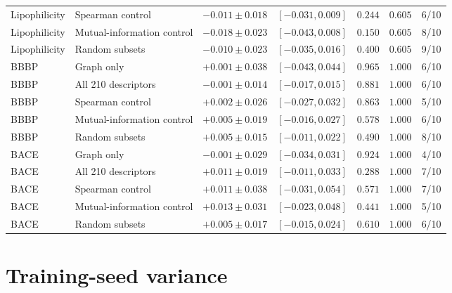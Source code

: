 \documentclass[10pt,a4paper]{article}
\begin{document}
\begin{table}[H]
\begin{tabular}{@{}llccccr@{}}
Lipophilicity & Spearman control & $-0.011\pm0.018$ & $[-0.031,0.009]$ & $0.244$ & $0.605$ & 6/10 \\
Lipophilicity & Mutual-information control & $-0.018\pm0.023$ & $[-0.043,0.008]$ & $0.150$ & $0.605$ & 8/10 \\
Lipophilicity & Random subsets & $-0.010\pm0.023$ & $[-0.035,0.016]$ & $0.400$ & $0.605$ & 9/10 \\
\midrule
BBBP & Graph only & $+0.001\pm0.038$ & $[-0.043,0.044]$ & $0.965$ & $1.000$ & 6/10 \\
BBBP & All 210 descriptors & $-0.001\pm0.014$ & $[-0.017,0.015]$ & $0.881$ & $1.000$ & 6/10 \\
BBBP & Spearman control & $+0.002\pm0.026$ & $[-0.027,0.032]$ & $0.863$ & $1.000$ & 5/10 \\
BBBP & Mutual-information control & $+0.005\pm0.019$ & $[-0.016,0.027]$ & $0.578$ & $1.000$ & 6/10 \\
BBBP & Random subsets & $+0.005\pm0.015$ & $[-0.011,0.022]$ & $0.490$ & $1.000$ & 8/10 \\
\midrule
BACE & Graph only & $-0.001\pm0.029$ & $[-0.034,0.031]$ & $0.924$ & $1.000$ & 4/10 \\
BACE & All 210 descriptors & $+0.011\pm0.019$ & $[-0.011,0.033]$ & $0.288$ & $1.000$ & 7/10 \\
BACE & Spearman control & $+0.011\pm0.038$ & $[-0.031,0.054]$ & $0.571$ & $1.000$ & 7/10 \\
BACE & Mutual-information control & $+0.013\pm0.031$ & $[-0.023,0.048]$ & $0.441$ & $1.000$ & 5/10 \\
BACE & Random subsets & $+0.005\pm0.017$ & $[-0.015,0.024]$ & $0.610$ & $1.000$ & 6/10 \\
\bottomrule
\end{tabular}
\end{table}
\addtocounter{table}{-1}

\section*{Training-seed variance}
\end{document}
